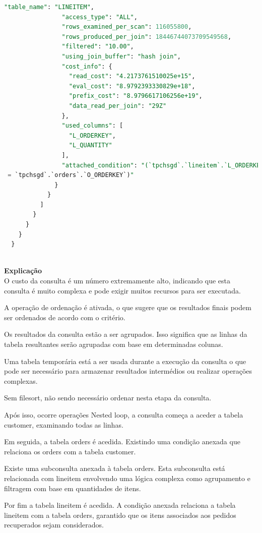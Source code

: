 \documentclass{article}
\begin{document}
\begin{lstlisting}[language=SQL]
                "table_name": "LINEITEM",
                "access_type": "ALL",
                "rows_examined_per_scan": 116055800,
                "rows_produced_per_join": 18446744073709549568,
                "filtered": "10.00",
                "using_join_buffer": "hash join",
                "cost_info": {
                  "read_cost": "4.2173761510025e+15",
                  "eval_cost": "8.9792393330829e+18",
                  "prefix_cost": "8.9796617106256e+19",
                  "data_read_per_join": "29Z"
                },
                "used_columns": [
                  "L_ORDERKEY",
                  "L_QUANTITY"
                ],
                "attached_condition": "(`tpchsgd`.`lineitem`.`L_ORDERKEY`
 = `tpchsgd`.`orders`.`O_ORDERKEY`)"
              }
            }
          ]
        }
      }
    }
  }
  


\end{lstlisting}

\textbf{Explicação}\\

O custo da consulta é um número extremamente alto, indicando que esta consulta é muito complexa e pode exigir muitos recursos para ser executada.

A operação de ordenação é ativada, o que sugere que os resultados finais podem ser ordenados de acordo com o critério.

Os resultados da consulta estão a ser agrupados. Isso significa que as linhas da tabela resultantes serão agrupadas com base em determinadas colunas.

Uma tabela temporária está a ser usada durante a execução da consulta o que pode ser necessário para armazenar resultados intermédios ou realizar operações complexas. 

Sem filesort, não sendo necessário ordenar nesta etapa da consulta.

Após isso, ocorre operações Nested loop, a consulta começa a aceder a tabela customer, examinando todas as linhas.

Em seguida, a tabela orders é acedida. Existindo uma condição anexada que relaciona os orders com a tabela customer. 

Existe uma subconsulta anexada à tabela orders. Esta subconsulta está relacionada com lineitem envolvendo uma lógica complexa como agrupamento e filtragem com base em quantidades de itens.

Por fim a tabela lineitem é acedida. A condição anexada relaciona a tabela lineitem com a tabela orders, garantido que os itens associados aos pedidos recuperados sejam considerados.
\end{document}
